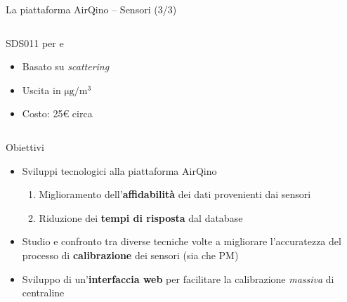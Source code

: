\begin{frame}[t]{La piattaforma AirQino – Sensori (3/3)}
\begin{columns}
\begin{column}{0.5\textwidth}
\begin{center}
\begin{block}{SDS011 per  e }
\begin{figure}[H]
    \centering
\end{figure}
\vspace{0.1cm}
\begin{itemize}
  \item Basato su \textit{scattering}
  \item Uscita in $\mathrm{\si{\micro}g/m^3}$
  \item Costo: 25€ circa
\end{itemize}
\vspace{0.1cm}

\end{block}
\end{center}
\end{column}

\end{columns}
\end{frame}

\begin{frame}{Obiettivi}
\begin{itemize}
  \item Sviluppi tecnologici alla piattaforma \alert{AirQino}
  \begin{enumerate}
    \item Miglioramento dell'\textbf{affidabilità} dei dati provenienti dai sensori
    \item Riduzione dei \textbf{tempi di risposta} dal database
  \end{enumerate}\vspace{0.3cm}
  \item Studio e confronto tra diverse tecniche volte a migliorare l’accuratezza del processo di \textbf{calibrazione} dei sensori (sia  che PM)\vspace{0.3cm}
  \item Sviluppo di un’\textbf{interfaccia web} per facilitare la calibrazione \textit{massiva} di centraline
\end{itemize}
\end{frame}


